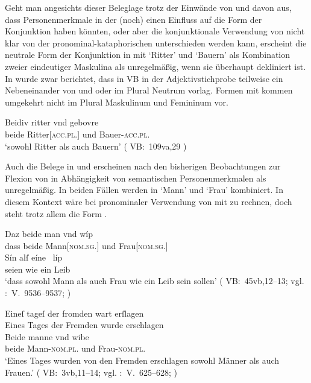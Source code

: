 Geht man angesichts dieser Beleglage trotz der Einwände von
\citet{gjelsten1980} und \citet{ksw2} davon aus, dass
Personenmerkmale in der \KC{} (noch) einen Einfluss auf die
Form der Konjunktion haben könnten, oder aber die konjunktionale Verwendung von
 nicht klar von der pronominal-kataphorischen
unterschieden werden kann, erscheint die neutrale Form der
Konjunktion in  mit  `Ritter' und
 `Bauern' als Kombination zweier eindeutiger Maskulina als
unregelmäßig, wenn sie überhaupt dekliniert ist. In
 wurde zwar berichtet, dass in VB in der
Adjektivstichprobe teilweise ein Nebeneinander von  und
 oder  im Plural Neutrum vorlag.
Formen mit  kommen umgekehrt nicht im Plural Maskulinum und Femininum
vor.

\begin{exe}
\ex\label{ex:rittergebure}
	\gll Beidiv ritter vnd gebovre \\
		beide Ritter[\textsc{acc.pl.\MascM}] und Bauer-\textsc{acc.pl.\MascM} \\
	\trans `sowohl Ritter als auch Bauern'
		(%
			VB:~109va,29%
		)
\end{exe}

Auch die Belege in  und  erscheinen
nach den bisherigen Beobachtungen zur Flexion von  in Abhängigkeit
von semantischen Personenmerkmalen
als unregelmäßig. In beiden Fällen werden in
 `Mann' und `Frau' kombiniert. In diesem Kontext wäre bei
pronominaler Verwendung von  mit  zu
rechnen, doch steht trotz allem die Form .

\begin{exe}
\ex \label{ex:konjmixbeide1}
	\begin{xlist}
	\ex \gll Daz beide man vnd wíp \\
			dass beide Mann[\textsc{nom.sg.\MascM}] und Frau[\textsc{nom.sg.\NeutF}] \\
	\sn \gll Sín alſ eíne~ líp \\
			seien wie ein Leib \\
		\trans `dass sowohl Mann als auch Frau wie ein Leib sein sollen'
			(%
				VB:~45vb,12--13; vgl.
				\KC:~V.~9536--9537;
				\cite[257]{schroeder1895}
			)
		\label{ex:konjmixbeide1_1}

	\ex \label{ex:konjmixbeide1_2}
		\gll Eineſ tageſ der fromden wart erſlagen \\
			Eines Tages der Fremden wurde erschlagen \\
		\textelp{}
	\sn \gll Beide manne vnd wibe \\
			beide Mann-\textsc{nom.pl.\MascM} und Frau-\textsc{nom.pl.\NeutF} \\
		\trans `Eines Tages wurden von den Fremden erschlagen \textelp{} 
			sowohl Männer als auch Frauen.'
			(%
				VB:~3vb,11--14; vgl.
				\KC:~V.~625--628;
				\cite[93]{schroeder1895}%
			)
	\end{xlist}
\end{exe}

